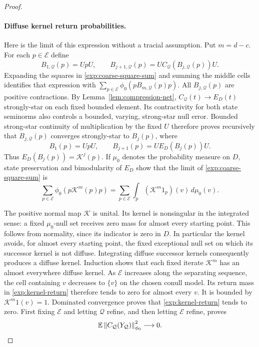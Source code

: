 \begin{proof}
\paragraph{Diffuse kernel return probabilities.}
Here is the limit of this expression without a tracial assumption.
Put $m=d-c$. For each $p\in\mathcal E$ define
\[
 B_{1,\mathcal Q}(p)=UpU,\qquad
 B_{j+1,\mathcal Q}(p)=U C_{\mathcal Q}(B_{j,\mathcal Q}(p))U.
\]
Expanding the squares in \eqref{exp:coarse-square-sum} and summing the
middle cells identifies that expression with
$\sum_{p\in\mathcal E}\phi_0(pB_{m,\mathcal Q}(p)p)$.
All $B_{j,\mathcal Q}(p)$ are positive contractions. By
Lemma~\ref{lem:compression-net}, $C_{\mathcal Q}(t)\to E_D(t)$
strongly-star on each fixed bounded element. Its contractivity for
both state seminorms also controls a bounded, varying, strong-star
null error. Bounded strong-star continuity of multiplication by the
fixed $U$ therefore proves recursively that $B_{j,\mathcal Q}(p)$
converges strongly-star to $B_j(p)$, where
\[
 B_1(p)=UpU,\qquad B_{j+1}(p)=U E_D(B_j(p))U.
\]
Thus $E_D(B_j(p))=\mathcal K^j(p)$. If $\mu_0$ denotes the probability
measure on $D$, state preservation and bimodularity of $E_D$ show that
the limit of \eqref{exp:coarse-square-sum} is
\begin{equation}\label{exp:kernel-return}
 \sum_{p\in\mathcal E}\phi_0(p\mathcal K^m(p)p)
 =\sum_{p\in\mathcal E}\int_p(\mathcal K^m1_p)(v)\,d\mu_0(v).
\end{equation}

The positive normal map $\mathcal K$ is unital. Its kernel is
nonsingular in the integrated sense: a fixed $\mu_0$-null set receives
zero mass for almost every starting point. This follows from
normality, since its indicator is zero in $D$. In particular the
kernel avoids, for almost every starting point, the fixed exceptional
null set on which its successor kernel is not diffuse. Integrating
diffuse successor kernels consequently produces a diffuse kernel.
Induction shows that each fixed iterate $\mathcal K^m$ has an almost
everywhere diffuse kernel. As $\mathcal E$ increases along the
separating sequence, the cell containing $v$ decreases to $\{v\}$ on
the chosen conull model. Its return mass in
\eqref{exp:kernel-return} therefore tends to zero for almost every
$v$. It is bounded by $\mathcal K^m1(v)=1$. Dominated convergence
proves that \eqref{exp:kernel-return} tends to zero. First fixing
$\mathcal E$ and letting $\mathcal Q$ refine, and then letting
$\mathcal E$ refine, proves
\begin{equation}\label{exp:haar-square-zero}
 \mathbb E\left\lVert C_{\mathcal Q}(Y_{\mathcal Q})\right\rVert_{\phi_0}^2\longrightarrow0.
\end{equation}


\end{proof}
